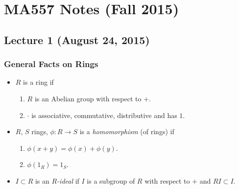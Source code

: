 \chapter{MA557 Notes (Fall 2015)}
\section{Lecture 1 (August 24, 2015)}
\subsection{General Facts on Rings}
\begin{itemize}[noitemsep]
\item $R$ is a ring if
  \begin{enumerate}[noitemsep,label=(\roman*)]
  \item $R$ is an Abelian group with respect to $+$.
  \item $\cdot$ is associative, commutative, distributive and has
    $1$.
  \end{enumerate}
\item $R$, $S$ rings, $\phi\colon R\to S$ is a
  \emph{homomorphism} (of rings) if
  \begin{enumerate}[noitemsep,label=(\roman*)]
  \item $\phi(x+y)=\phi(x)+\phi(y)$.
  \item $\phi(1_R)=1_S$.
  \end{enumerate}
\item $I\subset R$ is an \emph{$R$-ideal} if $I$ is a subgroup of
  $R$ with respect to $+$ and $RI\subset I$.
\end{itemize}



